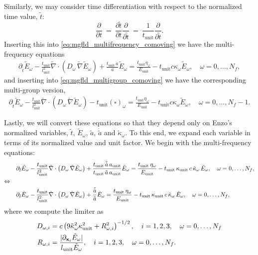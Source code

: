\documentclass[10pt]{article}
\renewcommand{\(}{\left(}
\renewcommand{\)}{\right)}
\newcommand{\xvec}{{\bf x}}
\newcommand{\adot}{\dot{a}}
\newcommand{\Aunit}{a_{\text{unit}}}
\newcommand{\Lunit}{l_{\text{unit}}}
\newcommand{\Tunit}{t_{\text{unit}}}
\newcommand{\Eunit}{E_{\text{unit}}}
\newcommand{\Kunit}{\kappa_{\text{unit}}}
\newcommand{\tK}{\tilde{\kappa}}
\newcommand{\tT}{\tilde{t}}
\newcommand{\tE}{\tilde{E}}
\newcommand{\tA}{\tilde{a}}
\newcommand{\tAdot}{\tilde{\adot}}
\newcommand{\tnabla}{\tilde{\nabla}}
\begin{document}
Similarly, we may consider time differentiation with respect to the
normalized time value, $\tT$:
\[
   \frac{\partial}{\partial t} \ = \
   \frac{\partial \tT}{\partial t} \frac{\partial}{\partial \tT} \ = \
   \frac{1}{\Tunit}\frac{\partial}{\partial \tT}.
\]
Inserting this into \eqref{eq:mgfld_multifrequency_comoving} we have
the multi-frequency equations
\begin{align}
  \label{eq:mgfld_multifrequency_tnormalized}
  \partial_{\tT} \tE_{\omega} - \frac{\Tunit}{\Lunit^2}\tnabla\cdot\(D_{\omega}\,\tnabla \tE_{\omega}\) + \frac{\Tunit\,\adot}{a}\tE_{\omega}
    = \frac{\Tunit\eta_{\omega}}{\Eunit} - \Tunit c\kappa_{\omega} \tE_{\omega}, \quad \omega=0,\ldots,N_f,
\end{align}
and inserting into \eqref{eq:mgfld_multigroup_comoving} we have the
corresponding multi-group version,
\begin{align}
  \label{eq:mgfld_multigroup_tnormalized}
  \partial_{\tT} \tE_{\omega} - \frac{\Tunit}{\Lunit^2}\tnabla\cdot(D_{\omega}\,\tnabla \tE_{\omega}) -
    \Tunit(\square)_{\omega} = \frac{\Tunit\eta_{\omega}}{\Eunit} - 
    \Tunit c \kappa_{\omega} \tE_{\omega}, \quad \omega=0,\ldots,N_f-1.
\end{align}


Lastly, we will convert these equations so that they depend only on
Enzo's normalized variables, $\tT$, $\tE_{\omega}$, $\tA$, $\dot{\tA}$ and
$\tK_{\omega}$.  To this end, we expand each variable in terms of its
normalized value and unit factor.  We begin with the multi-frequency
equations: 
\begin{align}
  \notag
  &\partial_{\tT} \tE_{\omega} - \frac{\Tunit}{\Lunit^2}\tnabla\cdot\(D_{\omega}\,\tnabla \tE_{\omega}\) + \frac{\Tunit\,\tAdot\,\Aunit}{\Tunit\,\tA\,\Aunit}\tE_{\omega}
    = \frac{\Tunit\,\eta_{\omega}}{\Eunit} - \Tunit\, \Kunit\, c\, \tK_{\omega}\, \tE_{\omega}, \quad
    \omega=0,\ldots,N_f,\\
\Leftrightarrow \quad & \\
  \label{eq:mgfld_multifrequency_comoving_normalized}
  &\partial_{\tT} \tE_{\omega} - \frac{\Tunit}{\Lunit^2}\tnabla\cdot\(D_{\omega}\,\tnabla \tE_{\omega}\) + \frac{\tAdot}{\tA}\tE_{\omega}
    = \frac{\Tunit\,\eta_{\omega}}{\Eunit} - \Tunit\, \Kunit\, c\, \tK_{\omega}\, \tE_{\omega}, \quad
    \omega=0,\ldots,N_f,
\end{align}
where we compute the limiter as
\begin{align}
  \label{eq:Morel_limiterD_normalized}
  D_{\omega,i} &= c \left(9\tK_{\omega}^2\Kunit^2 +
  R_{\omega,i}^2\right)^{-1/2}, \quad i=1,2,3,\quad \omega=0,\ldots,N_f\\
  \label{eq:Morel_limiterR_normalized}
  R_{\omega,i} &= \frac{|\partial_{\xvec_i}\tE_{\omega}|}{\Lunit \tE_{\omega}}, \quad i=1,2,3,\quad \omega=0,\ldots,N_f.
\end{align}
\end{document}
